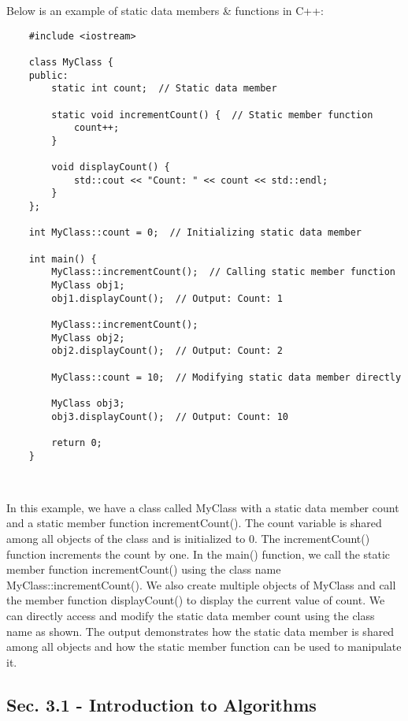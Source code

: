 \begin{solution}
    Below is an example of static data members \& functions in C++: \\
    \horizontalline
    \begin{verbatim}
    #include <iostream>
    
    class MyClass {
    public:
        static int count;  // Static data member
    
        static void incrementCount() {  // Static member function
            count++;
        }
    
        void displayCount() {
            std::cout << "Count: " << count << std::endl;
        }
    };
    
    int MyClass::count = 0;  // Initializing static data member
    
    int main() {
        MyClass::incrementCount();  // Calling static member function
        MyClass obj1;
        obj1.displayCount();  // Output: Count: 1
    
        MyClass::incrementCount();
        MyClass obj2;
        obj2.displayCount();  // Output: Count: 2
    
        MyClass::count = 10;  // Modifying static data member directly
    
        MyClass obj3;
        obj3.displayCount();  // Output: Count: 10
    
        return 0;
    }
    \end{verbatim} \\
    \horizontalline

    In this example, we have a class called MyClass with a static data member count and a static member function incrementCount(). The count variable is shared among all objects of the class and is initialized to 0. The incrementCount() function increments the count by one. In the main() function, we call the static member 
    function incrementCount() using the class name MyClass::incrementCount(). We also create multiple objects of MyClass and call the member function displayCount() to display the current value of count. We can directly access and modify the static data member count using the class name as shown. The output demonstrates how 
    the static data member is shared among all objects and how the static member function can be used to manipulate it. \\
\end{solution}

\subsection*{Sec. 3.1 - Introduction to Algorithms}
